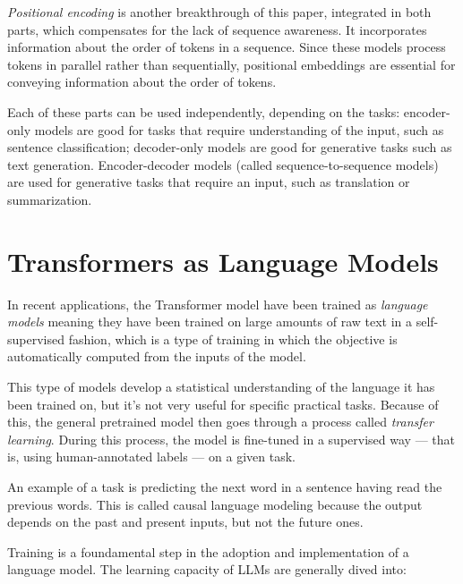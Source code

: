 \textit{Positional encoding} is another breakthrough of this paper, integrated in both parts, which compensates for the lack of sequence awareness. It incorporates information about the order of tokens in a sequence. Since these models process tokens in parallel rather than sequentially, positional embeddings are essential for conveying information about the order of tokens.

Each of these parts can be used independently, depending on the tasks: encoder-only models are good for tasks that require understanding of the input, such as sentence classification; decoder-only models are good for generative tasks such as text generation.
Encoder-decoder models (called sequence-to-sequence models) are used for generative tasks that require an input, such as translation or summarization.



\section{Transformers as Language Models}
In recent applications, the Transformer model have been trained as \textit{language models} meaning they have been trained on large amounts of raw text in a self-supervised fashion, which is a type of training in which the objective is automatically computed from the inputs of the model.

This type of models develop a statistical understanding of the language it has been trained on, but it’s not very useful for specific practical tasks. Because of this, the general pretrained model then goes through a process called \textit{transfer learning}. During this process, the model is fine-tuned in a supervised way — that is, using human-annotated labels — on a given task.

An example of a task is predicting the next word in a sentence having read the previous words. This is called causal language modeling because the output depends on the past and present inputs, but not the future ones.

Training is a foundamental step in the adoption and implementation of a language model. The learning capacity of LLMs are generally dived into:\cite{liu2024understanding}

